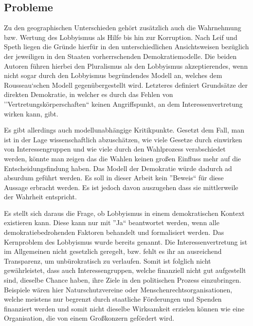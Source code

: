 \subsection{Probleme}
Zu den geographischen Unterschieden gehört zusätzlich auch die Wahrnehmung bzw. 
Wertung des 
Lobbyismus als Hilfe bis hin zur Korruption. Nach Leif und Speth liegen die 
Gründe hierfür in den unterschiedlichen Ansichtsweisen bezüglich der jeweiligen 
in den Staaten vorherrschenden Demokratiemodelle. Die beiden Autoren führen 
hierbei den Pluralismus als den Lobbyismus akzeptierendes, wenn nicht sogar 
durch 
den Lobbyismus begründendes Modell an, welches dem Rousseau`schen Modell 
gegenübergestellt wird. Letzteres definiert Grundsätze der direkten Demokratie, 
in welcher es durch das Fehlen von 
''Vertretungskörperschaften``\cite{WikiIdentitaetstheorie} keinen 
Angriffspunkt, an dem Interessenvertretung wirken kann, gibt.

Es gibt allerdings auch modellunabhängige Kritikpunkte. Gesetzt dem Fall, man 
ist in der Lage wissenschaftlich abzuschätzen, wie viele Gesetze durch einwirken
von Interessengruppen und wie viele durch den Wahlprozess verabschiedet werden, 
könnte man zeigen das die Wahlen keinen großen Einfluss mehr auf die 
Entscheidungsfindung haben. Das Modell der Demokratie würde dadurch ad absurdum 
geführt werden. Es soll in dieser Arbeit kein ''Beweis`` für diese Aussage 
erbracht werden. Es ist jedoch davon auszugehen dass sie mittlerweile der 
Wahrheit entspricht.

Es stellt sich daraus die Frage, ob Lobbyismus in einem demokratischen Kontext 
existieren kann. Diese kann nur mit ''Ja`` beantwortet werden, wenn alle 
demokratiebedrohenden Faktoren behandelt und formalisiert werden. Das 
Kernproblem des Lobbyismus wurde bereits genannt. Die Interessenvertretung ist 
im Allgemeinen nicht gesetzlich geregelt, bzw. fehlt es ihr an ausreichend 
Transparenz, um unbürokratisch zu verlaufen. Somit ist folglich nicht 
gewährleistet, 
dass auch Interessengruppen, welche finanziell nicht gut aufgestellt sind, 
dieselbe Chance haben, ihre Ziele in den politischen Prozess einzubringen. 
Beispiele 
wären hier Naturschutzvereine oder Menschenrechtsorganisationen, welche 
meistens nur begrenzt durch staatliche Förderungen und Spenden finanziert 
werden und somit nicht dieselbe Wirksamkeit erzielen können wie eine 
Organisation, die von einem Großkonzern gefördert wird.

